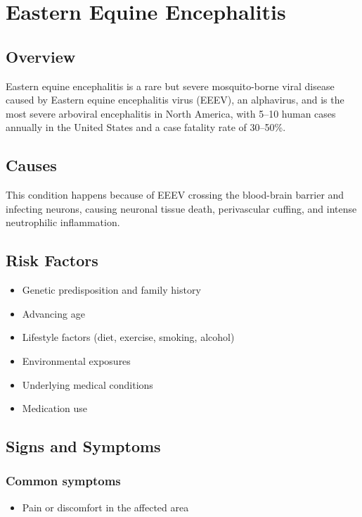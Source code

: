 \chapter{Eastern Equine Encephalitis}
\label{sec:Eastern Equine Encephalitis}

\section{Overview}
Eastern equine encephalitis is a rare but severe mosquito-borne viral disease caused by Eastern equine encephalitis virus (EEEV), an alphavirus, and is the most severe arboviral encephalitis in North America, with 5--10 human cases annually in the United States and a case fatality rate of 30--50\%.
\section{Causes}
This condition happens because of EEEV crossing the blood-brain barrier and infecting neurons, causing neuronal tissue death, perivascular cuffing, and intense neutrophilic inflammation.     
\section{Risk Factors}

\begin{itemize}[noitemsep]
  \item Genetic predisposition and family history
  \item Advancing age
  \item Lifestyle factors (diet, exercise, smoking, alcohol)
  \item Environmental exposures
  \item Underlying medical conditions
  \item Medication use
\end{itemize}
\section{Signs and Symptoms}

\subsection{Common symptoms}
\begin{itemize}[noitemsep]
  \item Pain or discomfort in the affected area
  \end{itemize}

